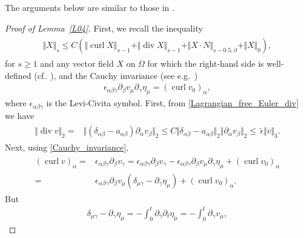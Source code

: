 \documentclass[10pt,reqno]{amsart}
\theoremstyle{plain}
\theoremstyle{definition}
\newtheorem{remark}[theorem]{Remark}
\numberwithin{equation}{section}
\newcommand{\al}{\alpha}
\newcommand{\be}{\beta}
\newcommand{\ga}{\gamma}
\newcommand{\de}{\delta}
\newcommand{\Om}{\Omega}
\newcommand{\dive}{\operatorname{div}}
\newcommand{\curl}{\operatorname{curl}}
\newcommand{\norm}[1]{\Vert#1\Vert}
\begin{document}
{%
The arguments below are similar to those in 
\cite{IgorMihaelaSurfaceTension,KukavicaTuffahaVicol-3dFreeEuler}.

{\begin{proof}[Proof of Lemma~\ref{L04}]
First, we recall the inequality
\begin{align}
\begin{split}
\norm{ X }_s \leq C ( \norm{\curl X}_{s-1} + \norm{\dive X }_{s-1}
+ \norm{ X \cdot N }_{s - 0.5,\partial} + \norm{X}_0 ),
\end{split}
\label{div_curl_estimate}
\end{align}
for $s \geq 1$ and any vector field $X$ on $\Om$ for which the right-hand
side is well-defined (cf.~\cite{ShkollerElliptic,CoutandShkollerFreeBoundary}), 
and the Cauchy invariance 
(see e.g.~\cite{BesseFrischCauchyInvariant,KukavicaTuffahaVicol-3dFreeEuler})
\begin{gather}
\epsilon_{\al \be \ga} \partial_\be v_\mu \partial_\ga \eta_\mu 
= (\curl v_0)_\al,
\label{Cauchy_invariance}
\end{gather}
where $\epsilon_{ \al \be \ga}$ is the Levi-Civita symbol.
First, from \eqref{Lagrangian_free_Euler_div} we have
\begin{align}
\begin{split}
\norm{ \dive v }_2 = & \norm{ (\de_{\al\be} - a_{\al\be} ) \partial_\al v_\be }_2
\leq 
C \norm{ \de_{\al\be} - a_{\al\be} }_2  \norm{ \partial_\al v_\be }_2 
\leq
\, 
\widetilde{\epsilon} \norm{v}_3.
\end{split}
\nonumber
\end{align}
Next, using \eqref{Cauchy_invariance},
\begin{align}
\begin{split}
(\curl v)_\al = & \epsilon_{\al\be\ga} \partial_\be v_\ga 
=
\epsilon_{\al\be\ga} \partial_\be v_\ga  - \epsilon_{\al\be\ga} \partial_\be v_\mu \partial_\ga 
\eta_\mu + (\curl v_0)_\al 
\\
= &
\epsilon_{\al \be \ga} \partial_\be v_\mu (\de_{\mu\ga} - \partial_\ga \eta_\mu) 
+ (\curl v_0)_\al .
\end{split}
\nonumber
\end{align}
But 
\begin{gather}
\de_{\mu\ga} - \partial_\ga\eta_\mu = - \int_0^t \partial_\ga \partial_t \eta_\mu 
= - \int_0^t \partial_\ga v_\mu,
\nonumber
\end{gather}

\end{proof}}}
\end{document}

